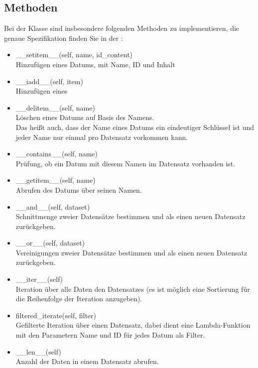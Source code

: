 \documentclass{article}
\begin{document}
		\subsection{Methoden}
			Bei der Klasse \grqq{} sind insbesondere folgenden Methoden zu implementieren, die genaue Spezifikation finden Sie in der \grqq{}:\\
			\begin{itemize}
				\item \_\_setitem\_\_(self, name, id\_content)\\
					Hinzufügen eines Datums, mit Name, ID und Inhalt
				\item \_\_iadd\_\_(self, item)\\
					Hinzufügen eines \grqq{}
				\item \_\_delitem\_\_(self, name)\\
					Löschen eines Datums auf Basis des Namens.\\
					Das heißt auch, dass der Name eines Datums ein eindeutiger Schlüssel ist und jeder Name nur einmal pro Datensatz vorkommen kann.
				\item \_\_contains\_\_(self, name)\\
					Prüfung, ob ein Datum mit diesem Namen im Datensatz vorhanden ist.
				\item \_\_getitem\_\_(self, name)\\
					Abrufen des Datums über seinen Namen.
				\item \_\_and\_\_(self, dataset)\\
					Schnittmenge zweier Datensätze bestimmen und als einen neuen Datensatz zurückgeben.
				\item \_\_or\_\_(self, dataset)\\
					Vereinigungen zweier Datensätze bestimmen und als einen neuen Datensatz zurückgeben.
				\item \_\_iter\_\_(self)\\
					Iteration über alle Daten den Datensatzes (es ist möglich eine Sortierung für die Reihenfolge der Iteration anzugeben).
				\item filtered\_iterate(self, filter)\\
					Gefilterte Iteration über einen Datensatz, dabei dient eine Lambda-Funktion mit den Parametern Name und ID für jedes Datum als Filter.
				\item \_\_len\_\_(self)\\
					Anzahl der Daten in einem Datensatz abrufen.\\
			\end{itemize}
	
\end{document}
